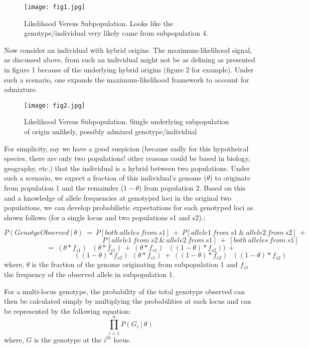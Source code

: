 \documentclass[]{article}
\begin{document}
\begin{figure}[H]
\centering
\texttt{[image: fig1.jpg]}
\caption{\label{fig:njtree}Likelihood Versus Subpopulation. Looks like the genotype/individual very likely came from subpopulation 4.}
\end{figure}

Now consider an individual with hybrid origins. The maximum-likelihood
signal, as discussed above, from such an individual might not be as
defining as presented in figure 1 because of the underlying hybrid
origins (figure 2 for example). Under such a scenario, one expands the
maximum-likelihood framework to account for admixture.

\begin{figure}[H]
\centering
\texttt{[image: fig2.jpg]}
\caption{\label{fig:njtree}Likelihood Versus Subpopulation. Single underlying subpopulation of origin unlikely, possibly admixed genotype/individual}
\end{figure}

For simplicity, say we have a good suspicion (because sadly for this
hypotheical species, there are only two populations! other reasons could
be based in biology, geography, etc.) that the individual is a hybrid
between two populations. Under such a scenario, we expect a fraction of
this individual's genome ($\theta$) to originate from population 1 and
the remainder ($1-\theta$) from population 2. Based on this and a
knowledge of allele frequencies at genotyped loci in the original two
populations, we can develop probabilistic expectations for each
genotyped loci as shown follows (for a single locus and two populations
s1 and s2).:

\[P(GenotyeObserved\ |\ \theta)\ =\ P[both\ alleles\ from\ s1]\ +\ P[allele1\ from\ s1\ \&\ allele2\ from\ s2]\ +\]
\[\quad \quad \quad \quad \quad \quad \quad \quad \quad \quad \quad \quad \quad \quad P[allele1\ from\ s2\ \&\ allele2\ from\ s1]\ +\ [both\ alleles\ from\ s1]\]
\linebreak
\[\quad \quad \quad =\ (\theta*f_{s1})\ \ \ (\theta*f_{s1})\ +\ (\theta*f_{s1})\ \ \ ((1-\theta)*f_{s2}))\ +\]
\[\quad \quad \quad \quad \quad \quad \quad \quad \quad \quad ((1-\theta)*f_{s2}) \ \ (\theta*f_{s1})\ +\ ((1-\theta)*f_{s2})\ \ \ ((1-\theta)*f_{s2})\]
where,\newline
$\theta$ is the fraction of the genome originating from subpopulation 1
and $f_{s1}$ the frequency of the observed allele in subpopulation 1.

For a multi-locus genotype, the probability of the total genotype
observed can then be calculated simply by multiplying the probabilities
at each locus and can be represented by the following equation:
\[\prod_{i=1}^{n}P(G_{i}\ |\ \theta)\] where,\newline
$G$ is the genotype at the $i^{th}$ locus.
\end{document}
